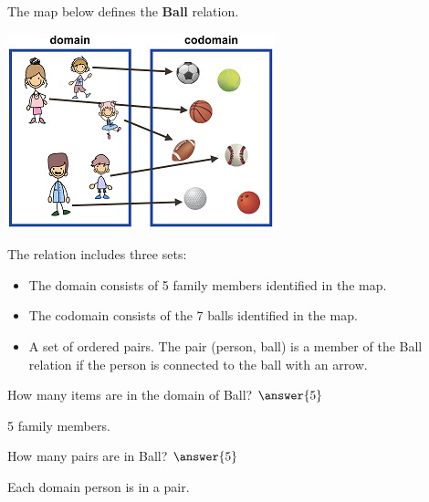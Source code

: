 \documentclass{ximera}
\begin{document}
\begin{definition}
  The map below defines the \textbf{Ball} relation. 
  
  

    \includegraphics[width=293px,height=214px]{pics/r28.png}

  
 

  The  relation includes three sets:
    \begin{itemize}
    \item The domain consists of 5 family members identified in the map.
    \item The codomain consists of the 7 balls identified in the map.
    \item A set of ordered pairs. The pair (person, ball) is a member of the Ball relation if the person is connected to the ball with an arrow.
    \end{itemize}

  
  
\end{definition}






\begin{exercise}
How many items are in the domain of Ball? $\answer{5}$
  \begin{feedback}
5 family members.
  \end{feedback}
\end{exercise}




\begin{exercise}
How many pairs are in Ball? $\answer{5}$
  \begin{feedback}
Each domain person is in a pair.
  \end{feedback}
\end{exercise}
\end{document}
